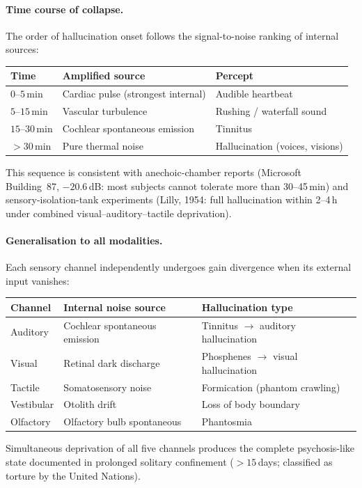 \documentclass[aps,pre,twocolumn,superscriptaddress,floatfix]{revtex4-2}
\begin{document}
\paragraph{Time course of collapse.}
The order of hallucination onset follows the
signal-to-noise ranking of internal sources:
\begin{center}
\begin{tabular}{@{}lll@{}}
\toprule
Time & Amplified source & Percept \\
\midrule
$0$--$5$\,min
  & Cardiac pulse (strongest internal)
  & Audible heartbeat \\
$5$--$15$\,min
  & Vascular turbulence
  & Rushing / waterfall sound \\
$15$--$30$\,min
  & Cochlear spontaneous emission
  & Tinnitus \\
$>30$\,min
  & Pure thermal noise
  & Hallucination (voices, visions) \\
\bottomrule
\end{tabular}
\end{center}
This sequence is consistent with anechoic-chamber
reports (Microsoft Building~87, $-20.6$\,dB:
most subjects cannot tolerate more than 30--45\,min)
and sensory-isolation-tank experiments
(Lilly, 1954: full hallucination within 2--4\,h
under combined visual--auditory--tactile deprivation).

\paragraph{Generalisation to all modalities.}
Each sensory channel independently undergoes gain
divergence when its external input vanishes:
\begin{center}
\begin{tabular}{@{}lll@{}}
\toprule
Channel & Internal noise source & Hallucination type \\
\midrule
Auditory & Cochlear spontaneous emission &
  Tinnitus $\to$ auditory hallucination \\
Visual & Retinal dark discharge &
  Phosphenes $\to$ visual hallucination \\
Tactile & Somatosensory noise &
  Formication (phantom crawling) \\
Vestibular & Otolith drift &
  Loss of body boundary \\
Olfactory & Olfactory bulb spontaneous &
  Phantosmia \\
\bottomrule
\end{tabular}
\end{center}
Simultaneous deprivation of all five channels produces
the complete psychosis-like state documented in
prolonged solitary confinement ($>15$\,days;
classified as torture by the United Nations).
\end{document}
